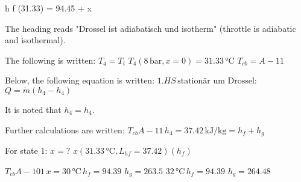 h f (31.33) = 94.45 + x

The heading reads "Drossel ist adiabatisch und isotherm" (throttle is adiabatic and isothermal).  

The following is written:  
\( T_4 = T_i \)  
\( T_4 (8 \, \text{bar}, x = 0) = 31.33 \, \text{°C} \)  
\( T_{cb} = A-11 \)  

Below, the following equation is written:  
\( 1. HS \, \text{stationär um Drossel:} \)  
\( Q = \dot{m} (h_4 - h_4) \)  

It is noted that \( h_4 = h_4 \).  

Further calculations are written:  
\( T_{cb} A-11 \, h_4 = 37.42 \, \text{kJ/kg} = h_f + h_g \)  

For state 1:  
\( x = ? \)  
\( x (31.33 \, \text{°C}, L_{hf} = 37.42) (h_f) \)  

\( T_{cb} A-101 \, x = 30 \, \text{°C} \, h_f = 94.39 \)  
\( h_g = 263.5 \)  
\( 32 \, \text{°C} \, h_f = 94.39 \)  
\( h_g = 264.48 \)